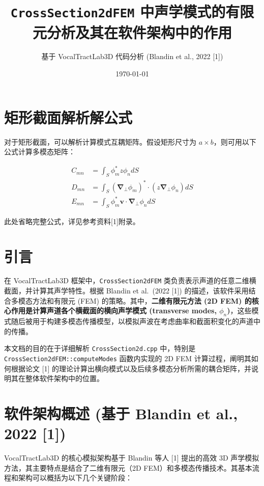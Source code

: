 \documentclass{ctexart}
\title{\texttt{CrossSection2dFEM} 中声学模式的有限元分析及其在软件架构中的作用}
\author{基于 VocalTractLab3D 代码分析 (Blandin et al., 2022 [1])}
\date{\today}
\begin{document}
\maketitle
\tableofcontents

\appendix
\section{矩形截面解析解公式}
\label{app:rect_analytical}
对于矩形截面，可以解析计算模式互耦矩阵。假设矩形尺寸为 $a \times b$，则可用以下公式计算多模态矩阵：

\begin{align*}
C_{mn} &= \int_S \phi_m^* z \phi_n dS \\
D_{mn} &= \int_S (\boldsymbol{\nabla}_\perp \phi_m)^* \cdot (z \boldsymbol{\nabla}_\perp \phi_n) dS \\
E_{mn} &= \int_S \phi_m^* \mathbf{v} \cdot \boldsymbol{\nabla}_\perp \phi_n dS
\end{align*}

此处省略完整公式，详见参考资料[1]附录。

\section{引言}
在 VocalTractLab3D 框架中，\texttt{CrossSection2dFEM} 类负责表示声道的任意二维横截面，并计算其声学特性。根据 Blandin et al.~(2022 [1]) 的描述，该软件采用结合多模态方法和有限元 (FEM) 的策略。其中，\textbf{二维有限元方法 (2D FEM) 的核心作用是计算声道各个横截面的横向声学模式 (transverse modes, $\phi_n$)}，这些模式随后被用于构建多模态传播模型，以模拟声波在考虑曲率和截面积变化的声道中的传播。

本文档的目的在于详细解析 \texttt{CrossSection2d.cpp} 中，特别是 \texttt{CrossSection2dFEM::computeModes} 函数内实现的 2D FEM 计算过程，阐明其如何根据论文 [1] 的理论计算出横向模式以及后续多模态分析所需的耦合矩阵，并说明其在整体软件架构中的位置。

\section{软件架构概述 (基于 Blandin et al., 2022 [1])}
VocalTractLab3D 的核心模拟架构基于 Blandin 等人 [1] 提出的高效 3D 声学模拟方法，其主要特点是结合了二维有限元（2D FEM）和多模态传播技术。其基本流程和架构可以概括为以下几个关键阶段：
\end{document}

